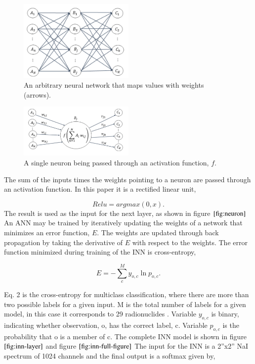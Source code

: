 \documentclass{anstrans}
\begin{document}
\begin{figure}[h]
\centering
\includegraphics[width=0.5\textwidth]{../figures/dense-layer-figure.png}
\caption{An arbitrary neural network that maps values with weights (arrows).}
\label{fig:dense-nn}
\end{figure}
\begin{figure}[h]
\centering
\includegraphics[width=0.5\textwidth]{../figures/neuron-figure.png}
\caption{A single neuron being passed through an activation function, $\textit{f}$.}
\label{fig:neuron}
\end{figure}

The sum of the inputs times the weights pointing to a neuron are passed through an activation function.
In this paper it is a rectified linear unit,

\begin{equation}
Relu = argmax(0, x).
\end{equation}
The result is used as the input for the next layer, as shown in figure $\ref{fig:neuron}$ 
An ANN may be trained by iteratively updating the weights of a network that minimizes an error function, $E$. 
The weights are updated through back propagation by taking the derivative of $E$ with respect to the weights. 
The error function minimized during training of the INN is cross-entropy,

\begin{equation}
E = -\sum_{c}^{M}y_{o,c}\ln{p_{o,c}}.
\end{equation}


Eq. 2 is the cross-entropy for multiclass classification, where there are more than two possible labels 
for a given input. M is the total number of labels for a given model, in this case it corresponds to 29 
radionuclides \cite{AmericanNationalStandard2016}. Variable $y_{o,c}$ is binary, indicating whether observation, o, has the correct label, c. 
Variable $p_{o,c}$ is the probability that o is a member of c. The complete INN model is shown in figure $\ref{fig:inn-layer}$ and figure $\ref{fig:inn-full-figure}$ 
The input for the INN is a 2”x2” NaI spectrum of 1024 channels and the final output is a softmax given by,
\end{document}
